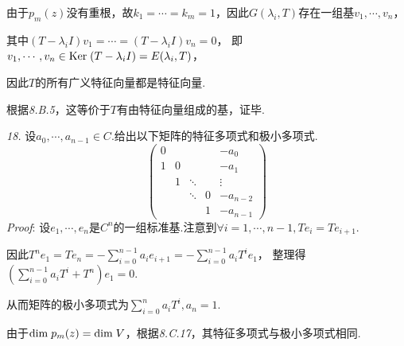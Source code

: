 由于$p_m(z)$没有重根，故$k_1=\cdots=k_m=1$，因此$G(\lambda_i,T)$存在一组基$v_1,\cdots,v_n$，

其中$(T-\lambda_i I)v_1=\cdots=(T-\lambda_i I)v_n=0$，
即$v_1,\cdots,v_n \in \mathrm{Ker \;} (T-\lambda_i I)=E(\lambda_i,T)$，

因此$T$的所有广义特征向量都是特征向量.

根据\textit{8.B.5}，这等价于$T$有由特征向量组成的基，证毕.

\hspace*{\fill}

\textit{18.}
设$a_0,\cdots,a_{n-1} \in C$.给出以下矩阵的特征多项式和极小多项式.
    \begin{equation*}
        \begin{pmatrix}
            0 &   &        &   & -a_0     \\
            1 & 0 &        &   & -a_1     \\
            & 1 & \ddots &   & \vdots   \\
            &   & \ddots & 0 & -a_{n-2} \\
            &   &        & 1 & -a_{n-1} 
        \end{pmatrix}
    \end{equation*}
\textit{Proof}:
设$e_1,\cdots,e_n$是$C^n$的一组标准基.注意到$\forall i=1,\cdots,n-1,Te_i=Te_{i+1}$.

因此$T^n e_1=Te_n=-\sum_{i=0}^{n-1}a_ie_{i+1}=-\sum_{i=0}^{n-1}a_iT^ie_1$，
整理得$(\sum_{i=0}^{n-1}a_iT^i+T^n)e_1=0$.

从而矩阵的极小多项式为$\sum_{i=0}^n a_iT^i,a_n=1$.

由于$\mathrm{dim \;} p_m(z)=\mathrm{dim \;} V$，根据\textit{8.C.17}，其特征多项式与极小多项式相同.

